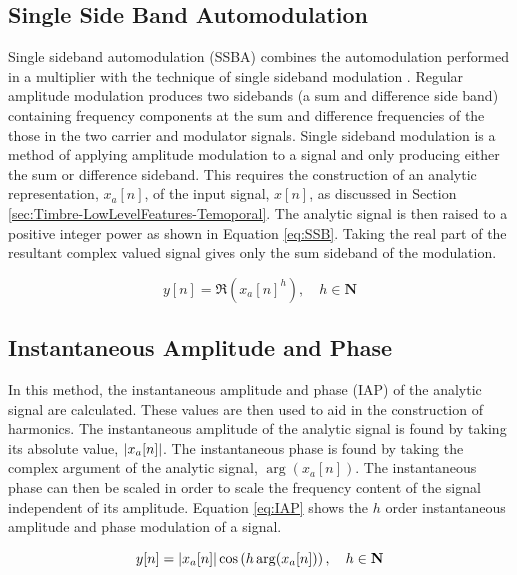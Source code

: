 	\subsection{Single Side Band Automodulation}
	\label{sec:Excitation-Methods-SSBA}
		Single sideband automodulation (SSBA) combines the automodulation performed in a multiplier with the
		technique of single sideband modulation \citep{corinthios2009signals}. Regular amplitude modulation produces
		two sidebands (a sum and difference side band) containing frequency components at the sum and difference
		frequencies of the those in the two carrier and modulator signals. Single sideband modulation is a method of
		applying amplitude modulation to a signal and only producing either the sum or difference sideband. This
		requires the construction of an analytic representation, $x_{a}[n]$, of the input signal, $x[n]$, as
		discussed in Section \ref{sec:Timbre-LowLevelFeatures-Temoporal}. The analytic signal is then raised to a
		positive integer power as shown in Equation \ref{eq:SSB}. Taking the real part of the resultant complex
		valued signal gives only the sum sideband of the modulation.

		\begin{equation}
			y[n] = \Re \left( x_{a}[n]^{h} \right), \quad h \in \textbf{N}
			\label{eq:SSB}
		\end{equation}

	\subsection{Instantaneous Amplitude and Phase}
	\label{sec:Excitation-Methods-IAP}
		In this method, the instantaneous amplitude and phase (IAP) of the analytic signal are calculated. These
		values are then used to aid in the construction of harmonics. The instantaneous amplitude of the analytic
		signal is found by taking its absolute value, $\left|x_{a}[n]\right|$. The instantaneous phase is found by taking
		the complex argument of the analytic signal, $\arg(x_{a}[n])$. The instantaneous phase can then be scaled
		in order to scale the frequency content of the signal independent of its amplitude. Equation \ref{eq:IAP}
		shows the $h$ order instantaneous amplitude and phase modulation of a signal.

		\begin{equation}
			y[n] = \left|x_{a}[n]\right| \cos \left( h\arg(x_{a}[n]) \right), \quad h \in \textbf{N}
			\label{eq:IAP}
		\end{equation}

